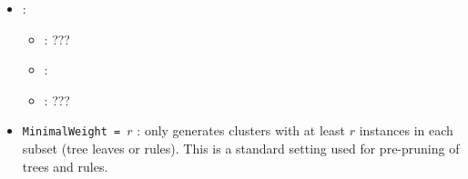 \begin{itemize}
\begin{itemize}
                \item \optionDescrption{}: ???
           \end{itemize}
    \item {}:
           \begin{itemize}
                \item \optionPossibleValues{}: ???
                \item \optionDefaultValue{}: 
                \item \optionDescrption{}: ???
           \end{itemize}
\end{itemize}



\begin{itemize}
	\item {\tt MinimalWeight = $r$} : \clus{} only generates clusters with at least $r$ instances in each subset (tree leaves or rules). This is a standard setting used for pre-pruning of trees and rules.
\end{itemize}

